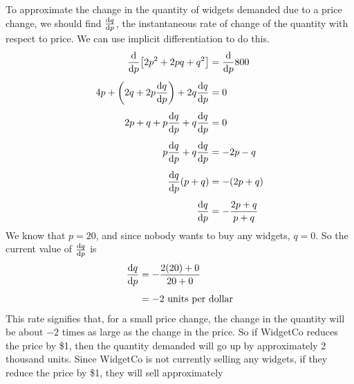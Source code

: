 \documentclass[main]{subfiles}
\begin{document}
\begin{enumerate}[resume]
\begin{solution}
    To approximate the change in the quantity of widgets demanded due to a price change, we should find $\diff{q}{p}$, the instantaneous rate of change of the quantity with respect to price. We can use implicit differentiation to do this.
    \begin{align*}
        \diff*{\!\left[2p^2+2pq+q^2\right]}{p} &= \diff*{800}{p} \\[4pt]
        4p + \left(2q+2p\diff{q}{p}\right) + 2q\diff{q}{p} &= 0 \\[4pt]
        2p + q + p\diff{q}{p} + q\diff{q}{p} &= 0 \\[4pt]
        p\diff{q}{p} + q \diff{q}{p} &= -2p - q \\[4pt]
        \diff{q}{p} (p+q) &= -(2p+q) \\[4pt]
        \diff{q}{p} &= -\frac{2p+q}{p+q}
    \end{align*}
    We know that $p=20$, and since nobody wants to buy any widgets, $q=0$. So the current value of $\diff{q}{p}$ is 
    \begin{align*}
        \diff{q}{p} &= -\dfrac{2(20)+0}{20+0} \\[4pt]
        &= -2 \text{ units per dollar}
    \end{align*}
    This rate signifies that, for a small price change, the change in the quantity will be about $-2$ times as large as the change in the price. So if WidgetCo reduces the price by \$1, then the quantity demanded will go up by approximately 2 thousand units. Since WidgetCo is not currently selling any widgets, if they reduce the price by \$1, they will sell approximately 
\end{solution}

\end{enumerate}
\end{document}
